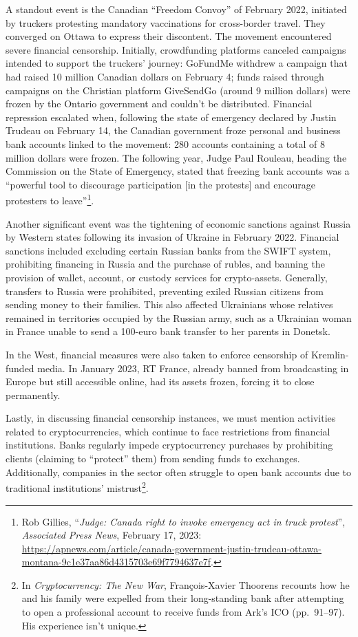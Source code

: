 \documentclass[
  a5paper,
  smalldemyvopaper,10pt,twoside,onecolumn,openright,extrafontsizes,hidelinks]{memoir}
\begin{document}
A standout event is the Canadian ``Freedom Convoy'' of February 2022,
initiated by truckers protesting mandatory vaccinations for cross-border
travel. They converged on Ottawa to express their discontent. The
movement encountered severe financial censorship. Initially,
crowdfunding platforms canceled campaigns intended to support the
truckers' journey: GoFundMe withdrew a campaign that had raised 10
million Canadian dollars on February 4; funds raised through campaigns
on the Christian platform GiveSendGo (around 9 million dollars) were
frozen by the Ontario government and couldn't be distributed. Financial
repression escalated when, following the state of emergency declared by
Justin Trudeau on February 14, the Canadian government froze personal
and business bank accounts linked to the movement: 280 accounts
containing a total of 8 million dollars were frozen. The following year,
Judge Paul Rouleau, heading the Commission on the State of Emergency,
stated that freezing bank accounts was a ``powerful tool to discourage
participation {[}in the protests{]} and encourage protesters to
leave''\footnote{Rob Gillies, ``\emph{Judge: Canada right to invoke
  emergency act in truck protest}'', \emph{Associated Press News},
  February 17, 2023:
  \url{https://apnews.com/article/canada-government-justin-trudeau-ottawa-montana-9c1e37aa86d4315703e69f7794637e7f}.}.

Another significant event was the tightening of economic sanctions
against Russia by Western states following its invasion of Ukraine in
February 2022. Financial sanctions included excluding certain Russian
banks from the SWIFT system, prohibiting financing in Russia and the
purchase of rubles, and banning the provision of wallet, account, or
custody services for crypto-assets. Generally, transfers to Russia were
prohibited, preventing exiled Russian citizens from sending money to
their families. This also affected Ukrainians whose relatives remained
in territories occupied by the Russian army, such as a Ukrainian woman
in France unable to send a 100-euro bank transfer to her parents in
Donetsk.

In the West, financial measures were also taken to enforce censorship of
Kremlin-funded media. In January 2023, RT France, already banned from
broadcasting in Europe but still accessible online, had its assets
frozen, forcing it to close permanently.

Lastly, in discussing financial censorship instances, we must mention
activities related to cryptocurrencies, which continue to face
restrictions from financial institutions. Banks regularly impede
cryptocurrency purchases by prohibiting clients (claiming to ``protect''
them) from sending funds to exchanges. Additionally, companies in the
sector often struggle to open bank accounts due to traditional
institutions' mistrust\footnote{In \emph{Cryptocurrency: The New War},
  François-Xavier Thoorens recounts how he and his family were expelled
  from their long-standing bank after attempting to open a professional
  account to receive funds from Ark's ICO (pp.~91--97). His experience
  isn't unique.}.
\end{document}
